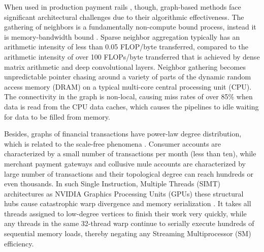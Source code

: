 \documentclass[journal]{IEEEtran}
\begin{document}
When used in production payment rails \cite{wang2021gnnadvisor, yan2020alleviating, jia2020improving}, though, graph-based methods face significant architectural challenges due to their algorithmic effectiveness. The gathering of neighbors is a fundamentally non-compute bound process, instead it is memory-bandwidth bound \cite{merrill2012scalable}. Sparse neighbor aggregation typically has an arithmetic intensity of less than 0.05 FLOP/byte transferred, compared to the arithmetic intensity of over 100 FLOPs/byte transferred that is achieved by dense matrix arithmetic and deep convolutional layers. Neighbor gathering becomes unpredictable pointer chasing around a variety of parts of the dynamic random access memory (DRAM) on a typical multi-core central processing unit (CPU). The connectivity in the graph is non-local, causing miss rates of over 85\% when data is read from the CPU data caches, which causes the pipelines to idle waiting for data to be filled from memory.

Besides, graphs of financial transactions have power-law degree distribution, which is related to the scale-free phenomena \cite{barabasi1999emergence}. Consumer accounts are characterized by a small number of transactions per month (less than ten), while merchant payment gateways and collusive mule accounts are characterized by large number of transactions and their topological degree can reach hundreds or even thousands. In such Single Instruction, Multiple Threads (SIMT) architectures as NVIDIA Graphics Processing Units (GPUs) these structural hubs cause catastrophic warp divergence and memory serialization \cite{wang2016gunrock, bell2009implementing}. It takes all threads assigned to low-degree vertices to finish their work very quickly, while any threads in the same 32-thread warp continue to serially execute hundreds of sequential memory loads, thereby negating any Streaming Multiprocessor (SM) efficiency.
\end{document}
